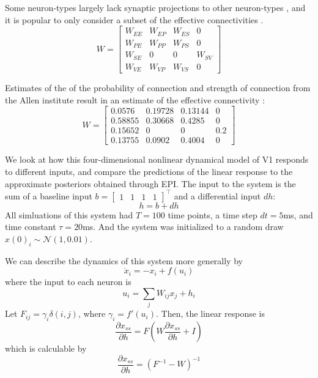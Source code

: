 \documentclass[11pt]{article}
\begin{document}
Some neuron-types largely lack synaptic projections to other neuron-types \cite{pfeffer2013inhibition}, and it is popular to only consider a subset of the effective connectivities \cite{litwin2016inhibitory}.
\begin{equation}
W = \begin{bmatrix} W_{EE} & W_{EP} & W_{ES} & 0 \\
                                W_{PE} & W_{PP} & W_{PS} & 0 \\
                                W_{SE} & 0 & 0 & W_{SV} \\
                                W_{VE} & W_{VP} &  W_{VS} &  0 \end{bmatrix}
\end{equation}

Estimates of the of the probability of connection and strength of connection from the Allen institute result in an estimate of the effective connectivity \cite{allen}: 
\begin{equation}
W = \begin{bmatrix} 0.0576 &  0.19728 & 0.13144 & 0 \\
                                0.58855 & 0.30668 & 0.4285 & 0 \\
                                0.15652 & 0 & 0 & 0.2 \\
                                0.13755 & 0.0902 &  0.4004 &  0 \end{bmatrix}
\end{equation}

We look at how this four-dimensional nonlinear dynamical model of V1 responds to different inputs, and compare the predictions of the linear response to the approximate posteriors obtained through EPI.  The input to the system is the sum of a baseline input $b = \begin{bmatrix} 1 & 1 & 1 & 1 \end{bmatrix}^\top$ and a differential input $dh$:
\begin{equation}
h = b + dh
\end{equation}
All simluations of this system had $T=100$ time points, a time step $dt = 5$ms, and time constant $\tau = 20$ms.  And the system was initialized to a random draw $x(0)_i \sim \mathcal{N}(1, 0.01)$.

We can describe the dynamics of this system more generally by
\begin{equation}
\dot{x}_i = -x_i + f(u_i)
\end{equation}
where the input to each neuron is
\begin{equation}
u_i = \sum_j W_{ij} x_j + h_i
\end{equation}
Let $F_{ij} = \gamma_i \delta(i,j)$, where $\gamma_i = f'(u_i)$.  Then, the linear response is
\begin{equation}
\frac{\partial x_{ss}}{\partial h} = F(W\frac{\partial x_{ss}}{\partial h} + I)
\end{equation}
which is calculable by
\begin{equation}
\frac{\partial x_{ss}}{\partial h} = (F^{-1} - W)^{-1}
\end{equation}
\end{document}

